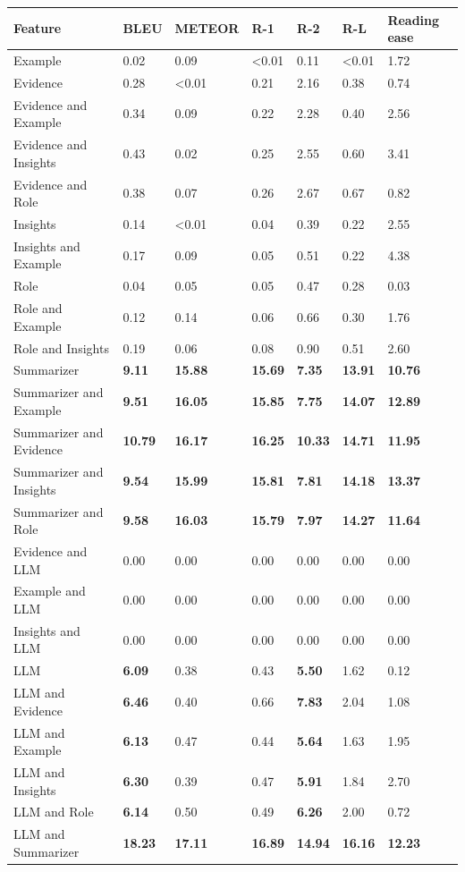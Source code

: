\begin{tabular}{|l|l|l|l|l|l|l|}
\hline
\textbf{Feature} & BLEU & METEOR & R-1 & R-2 & R-L & Reading ease \\
 \hline
 Example & 0.02 & 0.09 & \textless{}0.01 & 0.11 & \textless{}0.01 & 1.72 \\
 \hline
 Evidence & 0.28 & \textless{}0.01 & 0.21 & 2.16 & 0.38 & 0.74 \\
 \hline
 Evidence and Example & 0.34 & 0.09 & 0.22 & 2.28 & 0.40 & 2.56 \\
 \hline
 Evidence and Insights & 0.43 & 0.02 & 0.25 & 2.55 & 0.60 & 3.41 \\
 \hline
 Evidence and Role & 0.38 & 0.07 & 0.26 & 2.67 & 0.67 & 0.82 \\
 \hline
 Insights & 0.14 & \textless{}0.01 & 0.04 & 0.39 & 0.22 & 2.55 \\
 \hline
 Insights and Example & 0.17 & 0.09 & 0.05 & 0.51 & 0.22 & 4.38 \\
 \hline
 Role & 0.04 & 0.05 & 0.05 & 0.47 & 0.28 & 0.03 \\
 \hline
 Role and Example & 0.12 & 0.14 & 0.06 & 0.66 & 0.30 & 1.76 \\
 \hline
 Role and Insights & 0.19 & 0.06 & 0.08 & 0.90 & 0.51 & 2.60 \\
 \hline
 Summarizer & \textbf{9.11} & \textbf{15.88} & \textbf{15.69} & \textbf{7.35} & \textbf{13.91} & \textbf{10.76} \\
 \hline
 Summarizer and Example & \textbf{9.51} & \textbf{16.05} & \textbf{15.85} & \textbf{7.75} & \textbf{14.07} & \textbf{12.89} \\
 \hline
 Summarizer and Evidence & \textbf{10.79} & \textbf{16.17} & \textbf{16.25} & \textbf{10.33} & \textbf{14.71} & \textbf{11.95} \\
 \hline
 Summarizer and Insights & \textbf{9.54} & \textbf{15.99} & \textbf{15.81} & \textbf{7.81} & \textbf{14.18} & \textbf{13.37} \\
 \hline
 Summarizer and Role & \textbf{9.58} & \textbf{16.03} & \textbf{15.79} & \textbf{7.97} & \textbf{14.27} & \textbf{11.64} \\
 \hline
 Evidence and LLM & 0.00 & 0.00 & 0.00 & 0.00 & 0.00 & 0.00 \\
 \hline
 Example and LLM & 0.00 & 0.00 & 0.00 & 0.00 & 0.00 & 0.00 \\
 \hline
 Insights and LLM & 0.00 & 0.00 & 0.00 & 0.00 & 0.00 & 0.00 \\
 \hline
 LLM & \textbf{6.09} & 0.38 & 0.43 & \textbf{5.50} & 1.62 & 0.12 \\
 \hline
 LLM and Evidence & \textbf{6.46} & 0.40 & 0.66 & \textbf{7.83} & 2.04 & 1.08 \\
 \hline
 LLM and Example & \textbf{6.13} & 0.47 & 0.44 & \textbf{5.64} & 1.63 & 1.95 \\
 \hline
 LLM and Insights & \textbf{6.30} & 0.39 & 0.47 & \textbf{5.91} & 1.84 & 2.70 \\
 \hline
 LLM and Role & \textbf{6.14} & 0.50 & 0.49 & \textbf{6.26} & 2.00 & 0.72 \\
 \hline
 LLM and Summarizer & \textbf{18.23} & \textbf{17.11} & \textbf{16.89} & \textbf{14.94} & \textbf{16.16} & \textbf{12.23} \\
\hline
\end{tabular}

